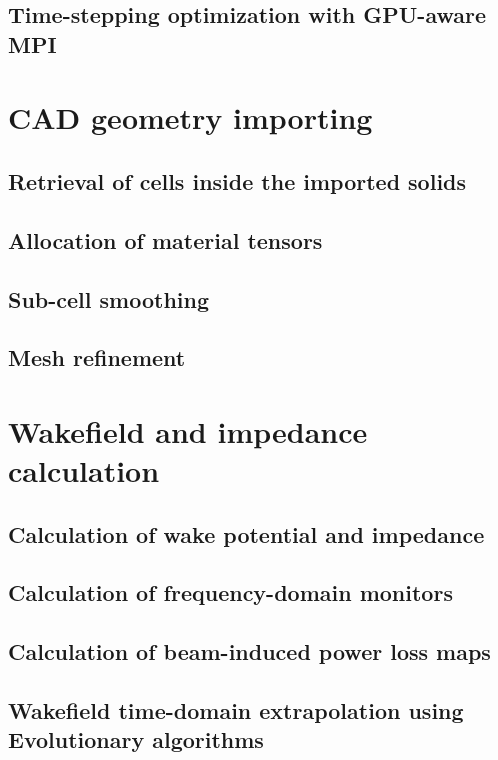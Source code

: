 \subsection{Time-stepping optimization with GPU-aware MPI}

\section{CAD geometry importing}

\subsection{Retrieval of cells inside the imported solids}

\subsection{Allocation of material tensors}

\subsection{Sub-cell smoothing}

\subsection{Mesh refinement}

\section{Wakefield and impedance calculation}

\subsection{Calculation of wake potential and impedance}

\subsection{Calculation of frequency-domain monitors}

\subsection{Calculation of beam-induced power loss maps}

\subsection{Wakefield time-domain extrapolation using Evolutionary algorithms}

